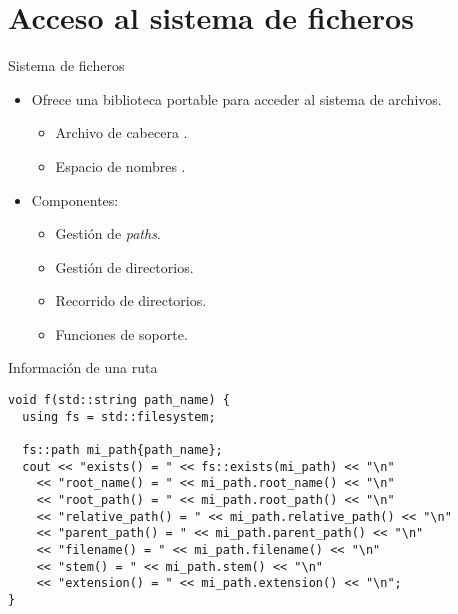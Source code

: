\section{Acceso al sistema de ficheros}

\begin{frame}[t]{Sistema de ficheros}
\begin{itemize}
  \item Ofrece una biblioteca portable para acceder al sistema de archivos.
    \begin{itemize}
      \item Archivo de cabecera .
      \item Espacio de nombres .
    \end{itemize}
 
  \vfill\pause
  \item Componentes:
    \begin{itemize}
      \item Gestión de \emph{paths}.
      \item Gestión de directorios.
      \item Recorrido de directorios.
      \item Funciones de soporte.
    \end{itemize}
\end{itemize}
\end{frame}

\begin{frame}[t,fragile]{Información de una ruta}
\begin{lstlisting}
void f(std::string path_name) {
  using fs = std::filesystem;

  fs::path mi_path{path_name};
  cout << "exists() = " << fs::exists(mi_path) << "\n"
    << "root_name() = " << mi_path.root_name() << "\n"
    << "root_path() = " << mi_path.root_path() << "\n"
    << "relative_path() = " << mi_path.relative_path() << "\n"
    << "parent_path() = " << mi_path.parent_path() << "\n"
    << "filename() = " << mi_path.filename() << "\n"
    << "stem() = " << mi_path.stem() << "\n"
    << "extension() = " << mi_path.extension() << "\n";
}
\end{lstlisting}
\end{frame}

